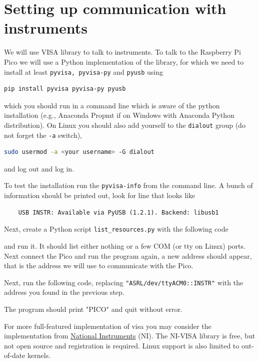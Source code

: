 \documentclass{article}
\newcommand{\ls}[1]{\lstinline{#1}}
\begin{document}
\section{Setting up communication with instruments}
\label{sec:pico}
We will use VISA library to talk to instruments. To talk to the Raspberry Pi Pico we will use a Python implementation of the library, for which we need to install at least \ls{pyvisa, pyvisa-py} and \ls{pyusb} using
\begin{lstlisting}[language=bash]
    pip install pyvisa pyvisa-py pyusb
\end{lstlisting}
which you should run in a command line which is aware of the python installation (e.g., Anaconda Propmt if on Windows with Anaconda Python distribution). On Linux you should also add yourself to the \ls{dialout} group (do not forget the \ls{-a} switch),
\begin{lstlisting}[language=bash]
    sudo usermod -a <your username> -G dialout 
\end{lstlisting}
and log out and log in.

To test the installation run the \ls{pyvisa-info} from the command line. A bunch of information should be printed out, look for line that looks like
\begin{lstlisting}
    USB INSTR: Available via PyUSB (1.2.1). Backend: libusb1
\end{lstlisting}

Next, create a Python script \ls{list_resources.py} with the following code

and run it. It should list either nothing or a few COM (or tty on Linux) ports. Next connect the Pico and run the program again, a new address should appear, that is the address we will use to communicate with the Pico.

Next, run the following code, replacing \ls{"ASRL/dev/ttyACM0::INSTR"} with the address you found in the previous step.

The program should print "PICO" and quit without error.

For more full-featured implementation of visa you may consider the implementation from \href{https://www.ni.com/en/support/downloads/drivers/download.ni-visa.html#548367}{National Instruments} (NI). The NI-VISA library is free, but not open source and registration is required. Linux support is also limited to out-of-date kernels.
\end{document}
